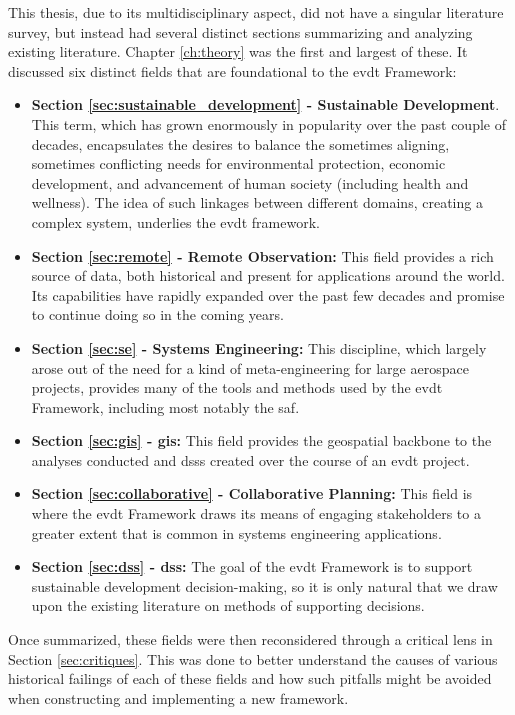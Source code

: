 This thesis, due to its multidisciplinary aspect, did not have a singular literature survey, but instead had several distinct sections summarizing and analyzing existing literature. Chapter \ref{ch:theory} was the first and largest of these. It discussed six distinct fields that are foundational to the \ac{evdt} Framework:

\begin{itemize}[itemsep=0pt,parsep=0pt]
	\item{\textbf{Section \ref{sec:sustainable_development} - Sustainable Development}. This term, which has grown enormously in popularity over the past couple of decades, encapsulates the desires to balance the sometimes aligning, sometimes conflicting needs for environmental protection, economic development, and advancement of human society (including health and wellness). The idea of such linkages between different domains, creating a complex system, underlies the \ac{evdt} framework.}
	\item{\textbf{Section \ref{sec:remote} - Remote Observation:} This field provides a rich source of data, both historical and present for applications around the world. Its capabilities have rapidly expanded over the past few decades and promise to continue doing so in the coming years.}
	\item{\textbf{Section \ref{sec:se} - Systems Engineering:} This discipline, which largely arose out of the need for a kind of meta-engineering for large aerospace projects, provides many of the tools and methods used by the \ac{evdt} Framework, including most notably the \acf{saf}.}
	\item{\textbf{Section \ref{sec:gis} - \Acf{gis}:} This field provides the geospatial backbone to the analyses conducted and \acp{dss} created over the course of an \ac{evdt} project.} 
	\item{\textbf{Section \ref{sec:collaborative} - Collaborative Planning:} This field is where the \ac{evdt} Framework draws its means of engaging stakeholders to a greater extent that is common in systems engineering applications.}
	\item{\textbf{Section \ref{sec:dss} - \Acf{dss}:} The goal of the \ac{evdt} Framework is to support sustainable development decision-making, so it is only natural that we draw upon the existing literature on methods of supporting decisions.}
\end{itemize}

Once summarized, these fields were then reconsidered through a critical lens in Section \ref{sec:critiques}. This was done to better understand the causes of various historical failings of each of these fields and how such pitfalls might be avoided when constructing and implementing a new framework. 

